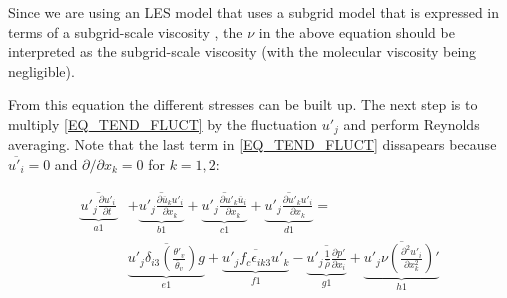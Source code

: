 \documentclass[10pt]{article}
\begin{document}
Since we are using an LES model that uses a subgrid model that is expressed in terms of a subgrid-scale viscosity \citep{heus}, 
the $\nu$ in the above equation should be interpreted as the subgrid-scale viscosity (with the molecular viscosity being negligible). 

From this equation the different stresses can be built up. The next step is to multiply \ref{EQ_TEND_FLUCT} by the fluctuation $u'_j$ 
and perform Reynolds averaging. Note that the last term in \ref{EQ_TEND_FLUCT} dissapears because $\overline{u'_i}=0$ and $\partial /\partial x_k=0$ for $k=1,2$:

\begin{equation}
\begin{split}
  \underbrace{ \overline{u'_j \frac{\partial u'_i}{\partial t}} }_{a1} & +
  \underbrace{ \overline{u'_j \frac{\partial \overline{u}_k           u'_i}{\partial{x_k}}} }_{b1} +
  \underbrace{ \overline{u'_j \frac{\partial u'_k \overline{u}_i}{\partial{x_k}}} }_{c1}+
  \underbrace{ \overline{u'_j \frac{\partial  u'_k  u'_i}{\partial{x_k}}} }_{d1} = \\
  &
  \underbrace{ \overline{u'_j \delta_{i3} \left( \frac{\theta'_v}{\overline{\theta}_v} \right) g } }_{e1} +
  \underbrace{ \overline{u'_j  f_c \epsilon_{ik3} u'_k} }_{f1}-
  \underbrace{ \overline{u'_j \frac{1}{\overline{\rho}} \frac{\partial p'}{\partial x_i}} }_{g1}+ 
  \underbrace{ \overline{u'_j \nu \left(\frac{\partial^2 u'_i}{\partial x^2_k}\right)'} }_{h1} 
  \label{EQ_TEND_FLUCT_UJ}
\end{split}
\end{equation}
\end{document}
